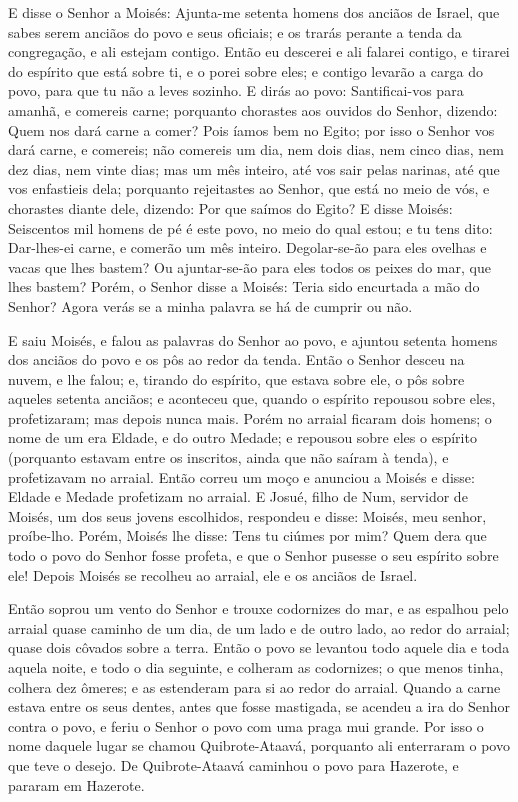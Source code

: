 E disse o Senhor a Moisés: Ajunta-me setenta homens dos anciãos
de Israel, que sabes serem anciãos do povo e seus oficiais; e os
trarás perante a tenda da congregação, e ali estejam contigo.
Então eu descerei e ali falarei contigo, e tirarei do
espírito que está sobre ti, e o porei sobre eles; e contigo levarão
a carga do povo, para que tu não a leves sozinho. E dirás ao
povo: Santificai-vos para amanhã, e comereis carne; porquanto
chorastes aos ouvidos do Senhor, dizendo: Quem nos dará carne a
comer? Pois íamos bem no Egito; por isso o Senhor vos dará carne, e
comereis; não comereis um dia, nem dois dias, nem cinco dias,
nem dez dias, nem vinte dias; mas um mês inteiro, até vos
sair pelas narinas, até que vos enfastieis dela; porquanto
rejeitastes ao Senhor, que está no meio de vós, e chorastes diante
dele, dizendo: Por que saímos do Egito? E disse Moisés:
Seiscentos mil homens de pé é este povo, no meio do qual estou; e tu
tens dito: Dar-lhes-ei carne, e comerão um mês inteiro.
Degolar-se-ão para eles ovelhas e vacas que lhes bastem? Ou
ajuntar-se-ão para eles todos os peixes do mar, que lhes bastem?
Porém, o Senhor disse a Moisés: Teria sido encurtada a mão do
Senhor? Agora verás se a minha palavra se há de cumprir ou não.

E saiu Moisés, e falou as palavras do Senhor ao povo, e ajuntou
setenta homens dos anciãos do povo e os pôs ao redor da tenda.
Então o Senhor desceu na nuvem, e lhe falou; e, tirando do
espírito, que estava sobre ele, o pôs sobre aqueles setenta anciãos;
e aconteceu que, quando o espírito repousou sobre eles,
profetizaram; mas depois nunca mais. Porém no arraial ficaram
dois homens; o nome de um era Eldade, e do outro Medade; e repousou
sobre eles o espírito (porquanto estavam entre os inscritos, ainda
que não saíram à tenda), e profetizavam no arraial. Então
correu um moço e anunciou a Moisés e disse: Eldade e Medade
profetizam no arraial. E Josué, filho de Num, servidor de
Moisés, um dos seus jovens escolhidos, respondeu e disse: Moisés,
meu senhor, proíbe-lho. Porém, Moisés lhe disse: Tens tu
ciúmes por mim? Quem dera que todo o povo do Senhor fosse profeta, e
que o Senhor pusesse o seu espírito sobre ele! Depois Moisés
se recolheu ao arraial, ele e os anciãos de Israel.

Então soprou um vento do Senhor e trouxe codornizes do mar, e as
espalhou pelo arraial quase caminho de um dia, de um lado e de outro
lado, ao redor do arraial; quase dois côvados sobre a terra.
Então o povo se levantou todo aquele dia e toda aquela noite,
e todo o dia seguinte, e colheram as codornizes; o que menos tinha,
colhera dez ômeres; e as estenderam para si ao redor do arraial.
Quando a carne estava entre os seus dentes, antes que fosse
mastigada, se acendeu a ira do Senhor contra o povo, e feriu o
Senhor o povo com uma praga mui grande. Por isso o nome
daquele lugar se chamou Quibrote-Ataavá, porquanto ali enterraram o
povo que teve o desejo. De Quibrote-Ataavá caminhou o povo
para Hazerote, e pararam em Hazerote.

